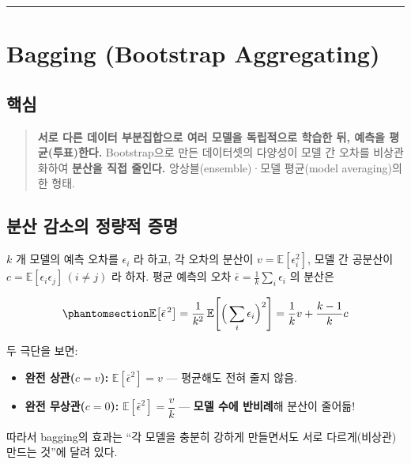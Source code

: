 \documentclass[
  letterpaper,
  DIV=11,
  numbers=noendperiod]{scrreprt}
\providecommand{\tightlist}{%
  \setlength{\itemsep}{0pt}\setlength{\parskip}{0pt}}
\begin{document}
\begin{center}\rule{0.5\linewidth}{0.5pt}\end{center}

\chapter{Bagging (Bootstrap Aggregating)}\label{sec-bagging}

\section{핵심}\label{uxd575uxc2ec-6}

\begin{quote}
\textbf{서로 다른 데이터 부분집합으로 여러 모델을 독립적으로 학습한 뒤,
예측을 평균(투표)한다.} Bootstrap으로 만든 데이터셋의 다양성이 모델 간
오차를 비상관화하여 \textbf{분산을 직접 줄인다.} 앙상블(ensemble)·모델
평균(model averaging)의 한 형태.
\end{quote}

\section{분산 감소의 정량적
증명}\label{uxbd84uxc0b0-uxac10uxc18cuxc758-uxc815uxb7c9uxc801-uxc99duxba85}

\(k\) 개 모델의 예측 오차를 \(\epsilon_i\) 라 하고, 각 오차의 분산이
\(v=\mathbb{E}[\epsilon_i^2]\), 모델 간 공분산이
\(c=\mathbb{E}[\epsilon_i\epsilon_j]\,(i\ne j)\) 라 하자. 평균 예측의
오차 \(\bar\epsilon=\tfrac1k\sum_i\epsilon_i\) 의 분산은

\begin{equation}\protect\phantomsection\label{eq-bagging}{
\mathbb{E}\!\left[\bar\epsilon^{\,2}\right]
= \frac{1}{k^2}\,\mathbb{E}\!\left[\Big(\sum_i \epsilon_i\Big)^2\right]
= \frac{1}{k}v + \frac{k-1}{k}c
}\end{equation}

두 극단을 보면:

\begin{itemize}
\tightlist
\item
  \textbf{완전 상관(\(c=v\)):} \(\mathbb{E}[\bar\epsilon^2]=v\) ---
  평균해도 전혀 줄지 않음.
\item
  \textbf{완전 무상관(\(c=0\)):}
  \(\mathbb{E}[\bar\epsilon^2]=\dfrac{v}{k}\) --- \textbf{모델 수에
  반비례}해 분산이 줄어듦!
\end{itemize}

따라서 bagging의 효과는 ``각 모델을 충분히 강하게 만들면서도 서로
다르게(비상관) 만드는 것''에 달려 있다.
\end{document}
